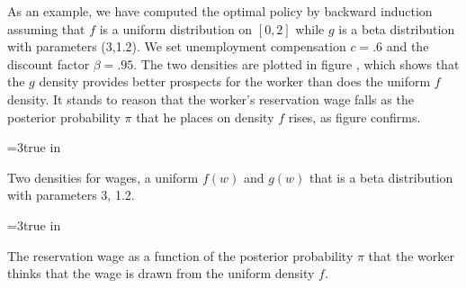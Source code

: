 As an example, we have computed the optimal policy by backward induction assuming that $f$ is a uniform distribution
on $[0, 2]$ while $g$ is a beta distribution with parameters (3,1.2). %
 We set unemployment compensation $c=.6$ and
the discount factor $\beta=.95$. The two densities are plotted
in figure , which shows that the  $g$ density provides better prospects for the worker than
does the uniform $f$ density.  It stands to reason that the worker's reservation wage  falls as the posterior
probability $\pi$ that he places on density $f$ rises, as figure  confirms.
%
%




\centerline{\epsfxsize=3true in}
\caption{Two densities for wages,  a uniform $f(w)$ and  $g(w)$ that is  a beta distribution
with parameters 3, 1.2.}
\endfigure



\centerline{\epsfxsize=3true in}
\caption{The reservation wage as a function of the posterior probability $\pi$  that the worker thinks
that the wage is drawn from the  uniform density $f$.}
\endfigure


